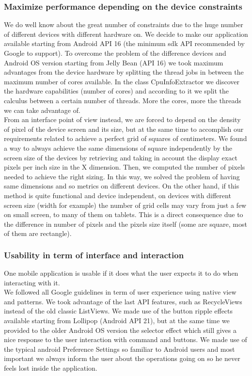 \subsubsection{Maximize performance depending on the device constraints}
We do well know about the great number of constraints due to the huge number of different devices with different hardware on. We decide to make our application available starting from Android API 16 (the minimum sdk API recommended by Google to support).  To overcome the problem of the difference devices and Android OS version starting from Jelly Bean (API 16) we took maximum advantages from the device hardware by splitting the thread jobs in between the maximum number of cores available. In the class CpuInfoExtractor we discover the hardware capabilities (number of cores) and according to it we split the calculus between a certain number of threads. More the cores, more the threads we can take advantage of.\\
From an interface point of view instead, we are forced  to depend on the density of pixel of the device screen and its size, but at the same time to accomplish our requirements related to achieve a perfect grid of squares of centimeters. We found a way to always achieve the same dimensions of square independently by the screen size of the devices by retrieving and taking in account the display exact pixels per inch size in the X dimension. Then, we computed the number of pixels needed to achieve the right sizing.  In this way, we solved the problem of having same dimensions and so metrics on different devices. On the other hand, if this method is quite functional and device independent, on devices with different screen size (width for example) the number of grid cells may vary from just a few on small screen, to many of them on tablets. This is a direct consequence due to the difference in number of pixels and the pixels size itself (some are square, most of them are rectangle).\\

\subsubsection{ Usability in term of interface and interaction}
One mobile application is usable if it does what the user expects it to do when interacting with it.\\
We followed all Google guidelines in term of user experience using native view and patterns. We took advantage of the last API features, such as RecycleViews instead of the old classic ListViews. We made use of the button ripple effects available starting from Lollipop (Android API 21), but at the same time we provided to the older Android OS version the selector effect which still gives a nice response to the user interaction with command and buttons. We made use of the typical android Preference Settings so familiar to Android users and most important we always inform the user about the operations going on so he never feels lost inside the application.